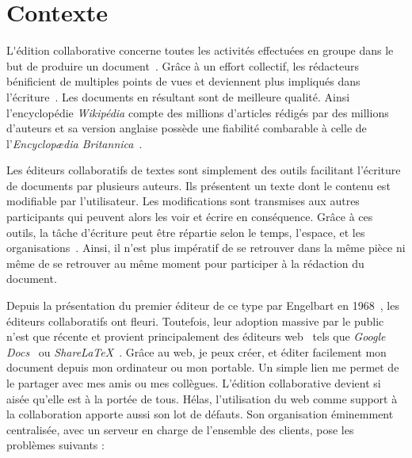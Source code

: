 
\section{Contexte}

\lettrine{L}'édition collaborative concerne toutes les activités effectuées en
groupe dans le but de produire un document~\cite{ellis1989concurrency,
  johansen1988groupware}. Grâce à un effort collectif, les rédacteurs
bénificient de multiples points de vues et deviennent plus impliqués dans
l'écriture~\cite{noel2004empirical}. Les documents en résultant sont de
meilleure qualité. Ainsi l'encyclopédie \emph{Wikipédia} compte des millions
d'articles rédigés par des millions d'auteurs et sa version anglaise possède une
fiabilité combarable à celle de l'\emph{Encyclopædia
  Britannica}~\cite{giles2005internet}.

Les éditeurs collaboratifs de textes sont simplement des outils facilitant
l'écriture de documents par plusieurs auteurs. Ils présentent un texte dont le
contenu est modifiable par l'utilisateur. Les modifications sont transmises aux
autres participants qui peuvent alors les voir et écrire en conséquence. Grâce à
ces outils, la tâche d'écriture peut être répartie selon le temps, l'espace, et
les organisations~\cite{grudin1994computersupported,
  johansen1988groupware}. Ainsi, il n'est plus impératif de se retrouver dans la
même pièce ni même de se retrouver au même moment pour participer à la rédaction
du document.

Depuis la présentation du premier éditeur de ce type par Engelbart en
1968~\cite{engelbart1968research}, les éditeurs collaboratifs ont
fleuri. Toutefois, leur adoption massive par le public n'est que récente et
provient principalement des éditeurs web~\cite{mogan2010impact,
  perkel2014scientific} tels que \emph{Google Docs}~\cite{googledocs} ou
\emph{ShareLaTeX}~\cite{sharelatex}. Grâce au web, je peux créer, et éditer
facilement mon document depuis mon ordinateur ou mon portable. Un simple lien me
permet de le partager avec mes amis ou mes collègues. L'édition collaborative
devient si aisée qu'elle est à la portée de tous. Hélas, l'utilisation du web
comme support à la collaboration apporte aussi son lot de défauts. Son
organisation éminemment centralisée, avec un serveur en charge de l'ensemble des
clients, pose les problèmes suivants :

